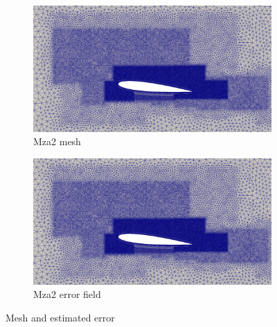 \begin{figure}[H]
\begin{subfigure}[b]{0.475\textwidth}
	\centering
	\includegraphics[width=1\textwidth]{figures/zonal_adapt_results/Mesh_and_error_plots/Mza2_inplane.png}
	\caption{Mza2 mesh}
	\label{fig:zonal_Mza2_mesh}
\end{subfigure}
\begin{subfigure}[b]{0.475\textwidth}
	\centering
	\includegraphics[width=1\textwidth]{figures/zonal_adapt_results/Mesh_and_error_plots/Mza2_inplane.png}
	\caption{Mza2 error field}
	\label{fig:zonal_Mza2_error}
\end{subfigure}


\caption{Mesh and estimated error}
\end{figure}